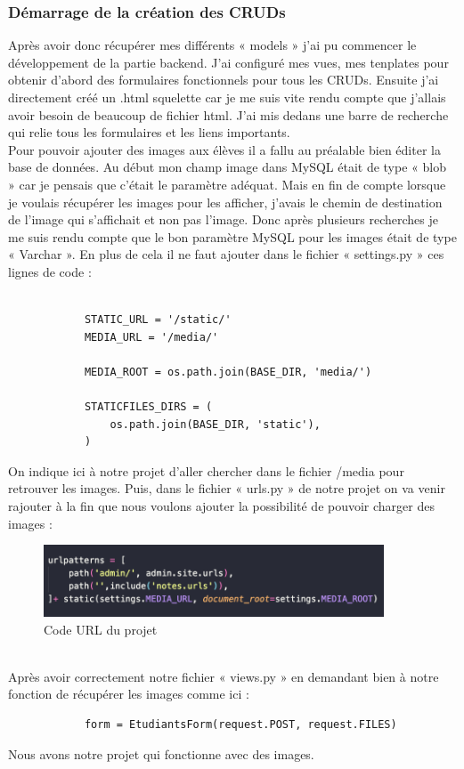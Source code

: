 \documentclass[12pt, a4paper]{article}
\begin{document}
            \subsubsection{Démarrage de la création des CRUDs}
            Après avoir donc récupérer mes différents « models » j’ai pu commencer le développement de la partie backend. J’ai configuré mes vues, mes tenplates pour obtenir d’abord des formulaires fonctionnels pour tous les CRUDs. Ensuite j’ai directement créé un .html squelette car je me suis vite rendu compte que j’allais avoir besoin de beaucoup de fichier html. J’ai mis dedans une barre de recherche qui relie tous les formulaires et les liens importants. 
            \\[0.5cm]Pour pouvoir ajouter des images aux élèves il a fallu au préalable bien éditer la base de données. Au début mon champ image dans MySQL était de type « blob » car je pensais que c’était le paramètre adéquat. Mais en fin de compte lorsque je voulais récupérer les images pour les afficher, j’avais le chemin de destination de l’image qui s’affichait et non pas l’image. Donc après plusieurs recherches je me suis rendu compte que le bon paramètre MySQL pour les images était de type « Varchar ». 
            En plus de cela il ne faut ajouter dans le fichier « settings.py » ces lignes de code :
            \begin{verbatim}

            STATIC_URL = '/static/'
            MEDIA_URL = '/media/'

            MEDIA_ROOT = os.path.join(BASE_DIR, 'media/')

            STATICFILES_DIRS = (
                os.path.join(BASE_DIR, 'static'),
            )
            \end{verbatim}
            \newpage
            On indique ici à notre projet d’aller chercher dans le fichier /media pour retrouver les images. 
            Puis, dans le fichier « urls.py » de notre projet on va venir rajouter à la fin que nous voulons ajouter la possibilité de pouvoir charger des images :
            \begin{figure}[h]
                \centering
                \includegraphics[width=0.9\textwidth]{url.png}
                \caption{Code URL du projet}
                \label{fig:url}
            \end{figure}
            \\Après avoir correctement notre fichier « views.py » en demandant bien à notre fonction de récupérer les images comme ici : 
            \begin{verbatim}
            form = EtudiantsForm(request.POST, request.FILES)
            \end{verbatim}
            Nous avons notre projet qui fonctionne avec des images.
\end{document}

